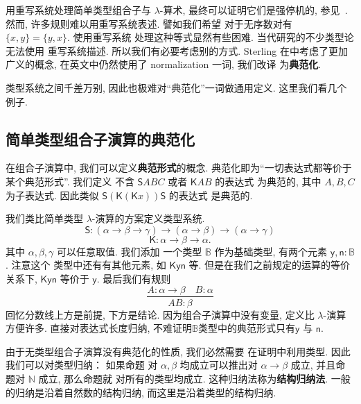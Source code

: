 \documentclass[UTF8]{ctexbook}
\newcommand{\cons}[1]{\textsf{#1}}
\theoremstyle{plain}
\theoremstyle{definition}
\theoremstyle{remark}
\begin{document}
用重写系统处理简单类型组合子与 \(\lambda\)-算术,
最终可以证明它们是强停机的, 参见~\cite{loader:1998:stlc}.
然而, 许多规则难以用重写系统表述. 譬如我们希望
对于无序数对有 \(\{x,y\} = \{y,x\}\). 使用重写系统
处理这种等式显然有些困难. 当代研究的不少类型论无法使用
重写系统描述. 所以我们有必要考虑别的方式. Sterling
在\cite{sterling:2021:thesis}中考虑了更加广义的概念,
在英文中仍然使用了 normalization 一词, 我们改译
为\textbf{典范化}.

类型系统之间千差万别, 因此也极难对“典范化”一词做通用定义.
这里我们看几个例子.

\subsection{简单类型组合子演算的典范化}
在组合子演算中, 我们可以定义\textbf{典范形式}的概念.
典范化即为“一切表达式都等价于某个典范形式”. 我们定义
不含 \(\cons{S}ABC\) 或者 \(\cons{K}AB\) 的表达式
为典范的, 其中 \(A,B,C\) 为子表达式. 因此类似
\(\cons{S}(\cons{K}(\cons{K}x))\cons{S}\) 的表达式
是典范的.

我们类比简单类型 \(\lambda\)-演算的方案定义类型系统.
\[\cons{S} : (\alpha \to \beta \to \gamma)
\to (\alpha \to \beta) \to (\alpha \to \gamma)\]
\[\cons{K} : \alpha \to \beta \to \alpha.\]
其中 \(\alpha,\beta,\gamma\) 可以任意取值. 我们添加
一个类型 \(\mathbb B\) 作为基础类型, 有两个元素
\(\cons{y}, \cons{n} : \mathbb B\). 注意这个
类型中还有有其他元素, 如 \(\cons{K}\cons{y}\cons{n}\) 等.
但是在我们之前规定的运算的等价关系下, \(\cons{K}\cons{y}\cons{n}\) 等价于 \(\cons{y}\).
最后我们有规则
\[\frac{A : \alpha \to \beta \quad B : \alpha}{AB : \beta}\]
回忆分数线上方是前提, 下方是结论. 因为组合子演算中没有变量,
定义比 \(\lambda\)-演算方便许多. 直接对表达式长度归纳,
不难证明\(\mathbb B\)类型中的典范形式只有\(\cons{y}\)
与 \(\cons{n}\).

由于无类型组合子演算没有典范化的性质, 我们必然需要
在证明中利用类型. 因此我们可以对类型归纳： 如果命题
对 \(\alpha,\beta\) 均成立可以推出对 \(\alpha\to\beta\)
成立, 并且命题对 \(\mathbb N\) 成立, 那么命题就
对所有的类型均成立. 这种归纳法称为\textbf{结构归纳法}.
一般的归纳是沿着自然数的结构归纳, 而这里是沿着类型的结构归纳.
\end{document}
